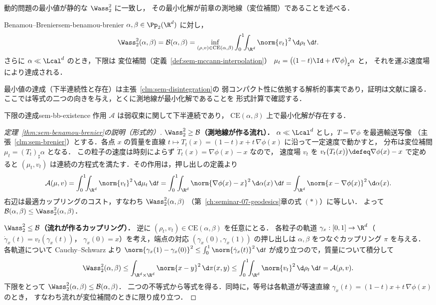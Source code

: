 動的問題の最小値が静的な $\Wass_2^2$ に一致し，
その最小化解が前章の測地線（変位補間）であることを述べる．

\begin{theorem}{Benamou--Brenier}{sem-benamou-brenier}
  $\alpha,\beta\in\Pp_2(\R^d)$ に対し，
  \[
    \Wass_2^2(\alpha,\beta)
    = \mathcal{B}(\alpha,\beta)
    = \inf_{(\rho,v)\in\mathrm{CE}(\alpha,\beta)}
      \int_0^1\!\!\int_{\R^d}\norm{v_t}^2\,\d\rho_t\,\d t .
  \]
  さらに $\alpha\ll\Lcal^d$ のとき，下限は
  変位補間（定義~\ref{def:sem-mccann-interpolation}）
  $\mu_t=\bigl((1-t)\Id+t\nabla\phi\bigr)_\sharp\alpha$ と，
  それを運ぶ速度場により達成される．
\end{theorem}

最小値の達成（下半連続性と存在）は主張~\ref{clm:sem-disintegration}の
弱コンパクト性に依拠する解析的事実であり，証明は文献に譲る．
ここでは等式の二つの向きを与え，とくに測地線が最小化解であることを
形式計算で確認する．

\begin{claim}{下限の達成}{sem-bb-existence}
  作用 $\mathcal{A}$ は弱収束に関して下半連続であり，
  $\mathrm{CE}(\alpha,\beta)$ 上で最小化解が存在する．
\end{claim}

\begin{proof}[定理~\ref{thm:sem-benamou-brenier}の説明（形式的）]
  \textbf{$\Wass_2^2\ge\mathcal{B}$（測地線が作る流れ）．}
  $\alpha\ll\Lcal^d$ とし，$T=\nabla\phi$ を最適輸送写像
  （主張~\ref{clm:sem-brenier}）とする．各点 $x$ の質量を直線
  $t\mapsto T_t(x)=(1-t)x+t\,\nabla\phi(x)$ に沿って一定速度で動かすと，
  分布は変位補間 $\mu_t=(T_t)_\sharp\alpha$ となる．
  この粒子の速度は時刻によらず $\dot T_t(x)=\nabla\phi(x)-x$ なので，
  速度場 $v_t$ を $v_t\bigl(T_t(x)\bigr)\defeq\nabla\phi(x)-x$ で定めると
  $(\mu_t,v_t)$ は連続の方程式を満たす．その作用は，押し出しの定義より
  \[
    \mathcal{A}(\mu,v)
    = \int_0^1\!\!\int_{\R^d}\norm{v_t}^2\,\d\mu_t\,\d t
    = \int_0^1\!\!\int_{\R^d}\norm{\nabla\phi(x)-x}^2\,\d\alpha(x)\,\d t
    = \int_{\R^d}\norm{x-\nabla\phi(x)}^2\,\d\alpha(x).
  \]
  右辺は最適カップリングのコスト，すなわち $\Wass_2^2(\alpha,\beta)$
  （第~\ref{ch:seminar-07-geodesics}章の式 $(\ast)$）に等しい．
  よって $\mathcal{B}(\alpha,\beta)\le\Wass_2^2(\alpha,\beta)$．

  \textbf{$\Wass_2^2\le\mathcal{B}$（流れが作るカップリング）．}
  逆に $(\rho_t,v_t)\in\mathrm{CE}(\alpha,\beta)$ を任意にとる．
  各粒子の軌道 $\gamma_x:[0,1]\to\R^d$（$\dot\gamma_x(t)=v_t(\gamma_x(t))$，
  $\gamma_x(0)=x$）を考え，端点の対応 $(\gamma_x(0),\gamma_x(1))$ の押し出しは
  $\alpha,\beta$ をつなぐカップリング $\pi$ を与える．
  各軌道について Cauchy--Schwarz より
  $\norm{\gamma_x(1)-\gamma_x(0)}^2
   \le\int_0^1\norm{\dot\gamma_x(t)}^2\,\d t$
  が成り立つので，質量について積分して
  \[
    \Wass_2^2(\alpha,\beta)
    \le \int_{\R^d\times\R^d}\norm{x-y}^2\,\d\pi(x,y)
    \le \int_0^1\!\!\int_{\R^d}\norm{v_t}^2\,\d\rho_t\,\d t
    = \mathcal{A}(\rho,v).
  \]
  下限をとって $\Wass_2^2(\alpha,\beta)\le\mathcal{B}(\alpha,\beta)$．
  二つの不等式から等式を得る．同時に，等号は各軌道が等速直線
  $\gamma_x(t)=(1-t)x+t\,\nabla\phi(x)$ のとき，
  すなわち流れが変位補間のときに限り成り立つ．
\end{proof}

